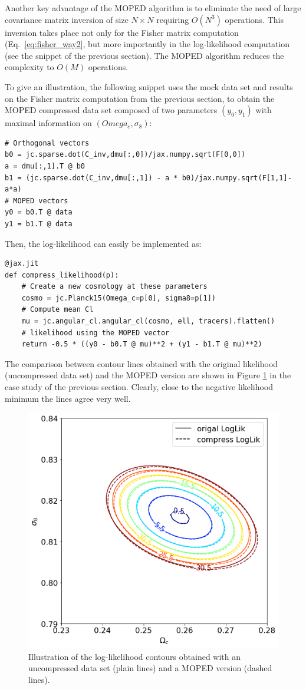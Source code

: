 \documentclass[twocolumn,twocolappendix,nofootinbib,iop]{openjournal}
\begin{document}
Another key advantage of the MOPED algorithm is to eliminate the need of large covariance matrix inversion of size $N\times N$ requiring $O(N^3)$ operations. This inversion takes place not only for the Fisher matrix computation (Eq.~\ref{eq:fisher_way2}, but more importantly in the log-likelihood computation (see the snippet of the previous section). The MOPED algorithm reduces the complexity to $O(M)$ operations.

To give an illustration, the following snippet uses the mock data set and results on the Fisher matrix computation from the previous section, to obtain the MOPED compressed data set composed of two parameters $(y_0,y_1)$ with maximal information on $(Omega_c, \sigma_8)$:  
\begin{lstlisting}[language=iPython]
# Orthogonal vectors
b0 = jc.sparse.dot(C_inv,dmu[:,0])/jax.numpy.sqrt(F[0,0])
a = dmu[:,1].T @ b0
b1 = (jc.sparse.dot(C_inv,dmu[:,1]) - a * b0)/jax.numpy.sqrt(F[1,1]-a*a)
# MOPED vectors
y0 = b0.T @ data
y1 = b1.T @ data
\end{lstlisting}
Then, the log-likelihood can easily be implemented as:
\begin{lstlisting}[language=iPython]
@jax.jit
def compress_likelihood(p):
    # Create a new cosmology at these parameters
    cosmo = jc.Planck15(Omega_c=p[0], sigma8=p[1])
    # Compute mean Cl
    mu = jc.angular_cl.angular_cl(cosmo, ell, tracers).flatten()
    # likelihood using the MOPED vector
    return -0.5 * ((y0 - b0.T @ mu)**2 + (y1 - b1.T @ mu)**2)
\end{lstlisting}
The comparison between contour lines obtained with the original likelihood (uncompressed data set) and the MOPED version are shown in Figure \ref{fig:moped} in the case study of the previous section. Clearly, close to the negative likelihood minimum the lines agree very well.
\begin{figure}
    \centering
    \includegraphics[width=\columnwidth]{figures/moded.png}
    \caption{Illustration of the log-likelihood contours obtained with an uncompressed data set (plain lines) and a MOPED version (dashed lines).} 
    \label{fig:moped}
\end{figure}
\end{document}
